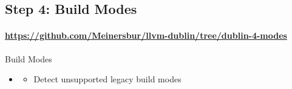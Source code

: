 \subsection{Step 4: Build Modes}
\framesubtitle{\url{https://github.com/Meinersbur/llvm-dublin/tree/dublin-4-modes}}
\begin{frame}[fragile]{Build Modes}
\begin{itemize}
  \item[\pgfuseimage{file}] 
  \begin{itemize}
     \item Detect unsupported legacy build modes
  \end{itemize}
\end{itemize}
\end{frame}



